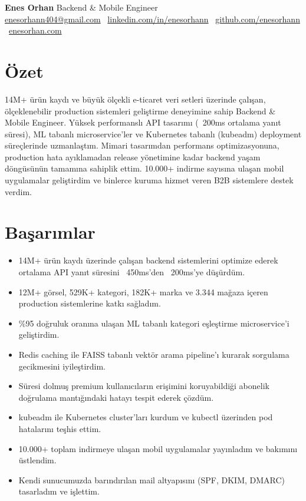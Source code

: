 \documentclass[10pt,a4paper]{extarticle}
\begin{document}
\begin{center}
\begin{minipage}{\textwidth}
\centering
{\LARGE\textbf{Enes Orhan}} \hspace{2pt} {\LARGE{Backend \& Mobile Engineer}}\\[10pt]
\href{mailto:enesorhann404@gmail.com}{enesorhann404@gmail.com} \textbullet\
\href{https://linkedin.com/in/enesorhann}{linkedin.com/in/enesorhann} \textbullet\
\href{https://github.com/enesorhann}{github.com/enesorhann} \textbullet\
\href{https://enesorhan.com}{enesorhan.com}
\end{minipage}
\end{center}

\section{Özet}
14M+ ürün kaydı ve büyük ölçekli e-ticaret veri setleri üzerinde çalışan, ölçeklenebilir production sistemleri geliştirme deneyimine sahip Backend \& Mobile Engineer.
Yüksek performanslı API tasarımı (~200ms ortalama yanıt süresi), ML tabanlı microservice'ler ve Kubernetes tabanlı (kubeadm) deployment süreçlerinde uzmanlaştım.
Mimari tasarımdan performans optimizasyonuna, production hata ayıklamadan release yönetimine kadar backend yaşam döngüsünün tamamına sahiplik ettim.
10.000+ indirme sayısına ulaşan mobil uygulamalar geliştirdim ve binlerce kuruma hizmet veren B2B sistemlere destek verdim.

\section{Başarımlar}
\begin{itemize}[leftmargin=*,noitemsep,topsep=0pt]
\item 14M+ ürün kaydı üzerinde çalışan backend sistemlerini optimize ederek ortalama API yanıt süresini ~450ms'den ~200ms'ye düşürdüm.
\item 12M+ görsel, 529K+ kategori, 182K+ marka ve 3.344 mağaza içeren production sistemlerine katkı sağladım.
\item \%95 doğruluk oranına ulaşan ML tabanlı kategori eşleştirme microservice'i geliştirdim.
\item Redis caching ile FAISS tabanlı vektör arama pipeline'ı kurarak sorgulama gecikmesini iyileştirdim.
\item Süresi dolmuş premium kullanıcıların erişimini koruyabildiği abonelik doğrulama mantığındaki hatayı tespit ederek çözdüm.
\item kubeadm ile Kubernetes cluster'ları kurdum ve kubectl üzerinden pod hatalarını teşhis ettim.
\item 10.000+ toplam indirmeye ulaşan mobil uygulamalar yayınladım ve bakımını üstlendim.
\item Kendi sunucumuzda barındırılan mail altyapısını (SPF, DKIM, DMARC) tasarladım ve işlettim.
\end{itemize}
\end{document}

